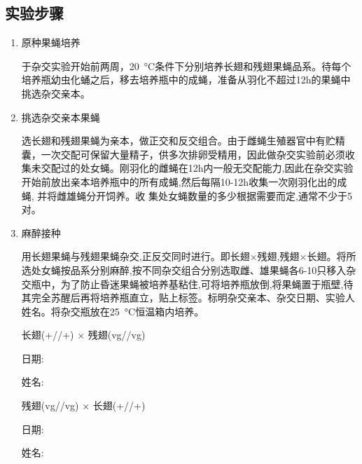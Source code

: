 \documentclass[AutoFakeBold]{LZUThesis}
\begin{document}
\subsection{实验步骤}
\begin{enumerate}
    \item 原种果蝇培养\par
    \hspace{2em}于杂交实验开始前两周，\SI{20}{\degreeCelsius}条件下分别培养长翅和残翅果蝇品系。待每个培养瓶幼虫化蛹之后，移去培养瓶中的成蝇，准备从羽化不超过12h的果蝇中挑选杂交亲本。
    \item 挑选杂交亲本果蝇\par
    \hspace{2em}选长翅和残翅果蝇为亲本，做正交和反交组合。由于雌蝇生殖器官中有贮精囊，一次交配可保留大量精子，供多次排卵受精用，因此做杂交实验前必须收集未交配过的处女蝇。刚羽化的雌蝇在12h内一般无交配能力,因此在杂交实验开始前放出亲本培养瓶中的所有成蝇,然后每隔10-12h收集一次刚羽化出的成蝇,
    并将雌雄蝇分开饲养。收
    集处女蝇数量的多少根据需要而定,通常不少于5对。
    \item 麻醉接种\par
    \hspace{2em}用长翅果蝇与残翅果蝇杂交,正反交同时进行。即长翅\female $\times$残翅\male,残翅\female $\times$长翅\male。将所选处女蝇按品系分别麻醉,按不同杂交组合分别选取雌、雄果蝇各6-10只移入杂交瓶中，为了防止昏迷果蝇被培养基粘住,可将培养瓶放倒,将果蝇置于瓶壁,待其完全苏醒后再将培养瓶直立，贴上标签。标明杂交亲本、杂交日期、实验人姓名。将杂交瓶放在\SI{25}{\degreeCelsius}恒温箱内培养。\par
    \vspace{0.25cm}
    \begin{minipage}{0.45\textwidth}
        \begin{tcolorbox}[colback=blue!10!white,colframe=blue!50!black,title=标签 1]
            \begin{center}
                \female 长翅(+//+) $\times$ \male 残翅(vg//vg)\par
            \end{center}
            日期: \par
            姓名: \par
        \end{tcolorbox}
    \end{minipage}%
    \hfill
    \begin{minipage}{0.45\textwidth}
        \begin{tcolorbox}[colback=green!10!white,colframe=green!50!black,title=标签 2]
            \begin{center}
                \female 残翅(vg//vg) $\times$ \male 长翅(+//+)\par
            \end{center}
            日期: \par
            姓名: \par
        \end{tcolorbox}
    \end{minipage}
    \vspace{0.25cm}


\end{enumerate}
\end{document}
